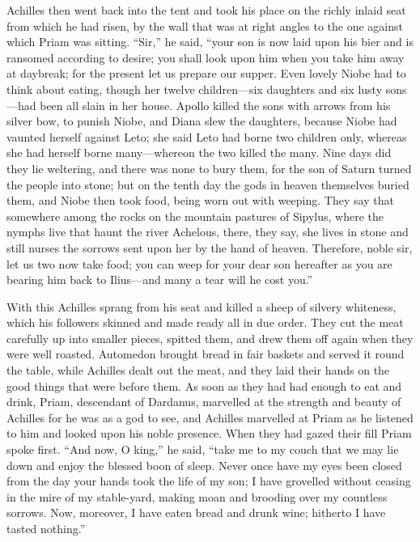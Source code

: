 Achilles then went back into the tent and took his place on the richly
inlaid seat from which he had risen, by the wall that was at right angles
to the one against which Priam was sitting. “Sir,” he said, “your son is
now laid upon his bier and is ransomed according to desire; you shall look
upon him when you take him away at daybreak; for the present let us
prepare our supper. Even lovely Niobe had to think about eating, though
her twelve children—six daughters and six lusty sons—had been
all slain in her house. Apollo killed the sons with arrows from his silver
bow, to punish Niobe, and Diana slew the daughters, because Niobe had
vaunted herself against Leto; she said Leto had borne two children only,
whereas she had herself borne many—whereon the two killed the many.
Nine days did they lie weltering, and there was none to bury them, for the
son of Saturn turned the people into stone; but on the tenth day the gods
in heaven themselves buried them, and Niobe then took food, being worn out
with weeping. They say that somewhere among the rocks on the mountain
pastures of Sipylus, where the nymphs live that haunt the river Achelous,
there, they say, she lives in stone and still nurses the sorrows sent upon
her by the hand of heaven. Therefore, noble sir, let us two now take food;
you can weep for your dear son hereafter as you are bearing him back to
Ilius—and many a tear will he cost you.”

With this Achilles sprang from his seat and killed a sheep of silvery
whiteness, which his followers skinned and made ready all in due order.
They cut the meat carefully up into smaller pieces, spitted them, and drew
them off again when they were well roasted. Automedon brought bread in
fair baskets and served it round the table, while Achilles dealt out the
meat, and they laid their hands on the good things that were before them.
As soon as they had had enough to eat and drink, Priam, descendant of
Dardanus, marvelled at the strength and beauty of Achilles for he was as a
god to see, and Achilles marvelled at Priam as he listened to him and
looked upon his noble presence. When they had gazed their fill Priam spoke
first. “And now, O king,” he said, “take me to my couch that we may lie
down and enjoy the blessed boon of sleep. Never once have my eyes been
closed from the day your hands took the life of my son; I have grovelled
without ceasing in the mire of my stable-yard, making moan and brooding
over my countless sorrows. Now, moreover, I have eaten bread and drunk
wine; hitherto I have tasted nothing.”

